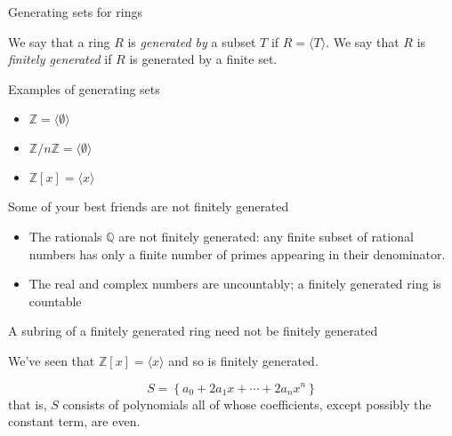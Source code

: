 \documentclass{beamer}
\begin{document}
\begin{frame}{Generating sets for rings}

\begin{definition}
We say that a ring $R$ is \emph{generated by} a subset $T$ if $R=\langle T\rangle$.  We say that $R$ is \emph{finitely generated} if $R$ is generated by a finite set.
\end{definition}

\end{frame}


\begin{frame}{Examples of generating sets}
\begin{itemize}
\item $\mathbb{Z}=\langle\emptyset\rangle $
\item $\mathbb{Z}/n\mathbb{Z}=\langle \emptyset \rangle $
\item $\mathbb{Z}[x]=\langle x \rangle$



\end{itemize}

\end{frame}


\begin{frame}{Some of your best friends are not finitely generated}

\begin{itemize} 
\item The rationals $\mathbb{Q}$ are not finitely generated: any finite subset of rational numbers has only a finite number of primes appearing in their denominator.  
\item The real and complex numbers are uncountably; a finitely generated ring is countable
\end{itemize}
\end{frame}

\begin{frame}{A subring of a finitely generated ring need not be finitely generated}


We've seen that $\mathbb{Z}[x]=\langle x\rangle$ and so is finitely generated.

$$S=\left\{ a_0+2a_1x+\cdots +2a_nx^n\right\}$$
that is, $S$ consists of polynomials all of whose coefficients, except possibly the constant term, are even.   
\end{frame}
\end{document}
